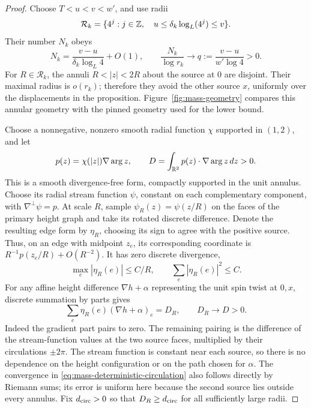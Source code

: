 \begin{proof}
Choose \(T<u<v<w'\), and use radii
\[
 \mathcal R_k=\{4^j:j\in\mathbb Z,\quad
                         u\le\delta_k\log_L(4^j)\le v\}.
\]
Their number \(N_k\) obeys
\begin{equation}\label{eq:mass-annulus-count}
 N_k=\frac{v-u}{\delta_k\log_L4}+O(1),\qquad
 \frac{N_k}{\log r_k}\longrightarrow
                          q:=\frac{v-u}{w'\log4}>0.
\end{equation}
For \(R\in\mathcal R_k\), the annuli
\(R<|z|<2R\) about the source at \(0\) are disjoint.
Their maximal radius is \(o(r_k)\); therefore they avoid the other
source \(x\), uniformly over the displacements in the proposition.
Figure~\ref{fig:mass-geometry} compares this annular geometry with
the pinned geometry used for the lower bound.


Choose a nonnegative, nonzero smooth radial function \(\chi\)
supported in \((1,2)\), and let
\[
       p(z)=\chi(|z|)\nabla\arg z,
       \qquad
       D=\int_{\mathbb R^2}p(z)\cdot\nabla\arg z\,dz>0.
\]
This is a smooth divergence-free form, compactly supported in the
unit annulus.  Choose its radial stream function \(\psi\), constant
on each complementary component, with \(\nabla^\perp\psi=p\).
At scale \(R\), sample \(\psi_R(z)=\psi(z/R)\) on the faces of
the primary height graph and take its rotated discrete difference.
Denote the resulting edge form by \(\eta_R\), choosing its sign
to agree with the positive source.  Thus, on an edge with midpoint
\(z_e\), its corresponding coordinate is
\(R^{-1}p(z_e/R)+O(R^{-2})\).
It has zero discrete divergence,
\begin{equation}\label{eq:mass-annulus-form}
 \max_e|\eta_R(e)|\le C/R,\qquad
 \sum_e|\eta_R(e)|^2\le C.
\end{equation}
For any affine height difference \(\nabla h+\alpha\) representing
the unit spin twist at \(0,x\), discrete summation by parts gives
\begin{equation}\label{eq:mass-deterministic-circulation}
 \sum_e\eta_R(e)(\nabla h+\alpha)_e=D_R,
                       \qquad D_R\longrightarrow D>0.
\end{equation}
Indeed the gradient part pairs to zero.  The remaining pairing is
the difference of the stream-function values at the two source
faces, multiplied by their circulations \(\pm2\pi\).
The stream function is constant near each source, so there is no
dependence on the height configuration or on the path chosen for
\(\alpha\).  The convergence in
\eqref{eq:mass-deterministic-circulation} also follows directly by
Riemann sums; its error is uniform here because the second source
lies outside every annulus.  Fix \(d_{\rm circ}>0\) so that \(D_R\ge d_{\rm circ}\)
for all sufficiently large radii.


\end{proof}
